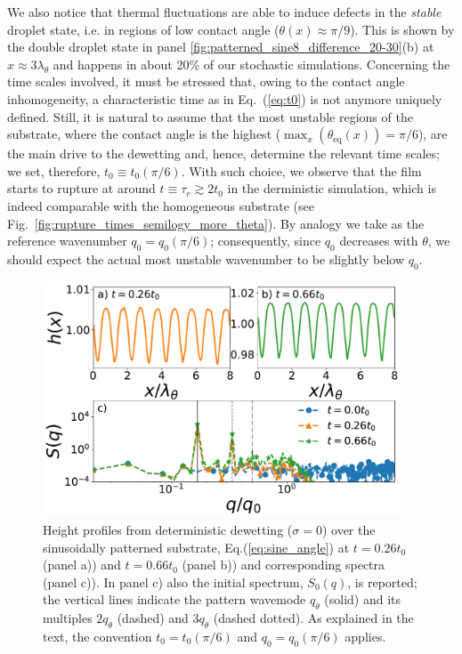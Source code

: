 We also notice that thermal fluctuations are able to induce defects in the \textit{stable} droplet state, i.e. in regions of low contact angle ($\theta(x) \approx \pi/9$). 
This is shown by the double droplet state in panel \ref{fig:patterned_sine8_difference_20-30}(b) at $x \approx 3 \lambda_{\theta}$ and happens in about 20\% of our stochastic simulations.
Concerning the time scales involved, it must be stressed that, owing to the contact angle inhomogeneity, a characteristic time as in Eq.~(\ref{eq:t0}) is not anymore uniquely defined. 
Still, it is natural to assume that the most unstable regions of the substrate, where the contact angle is the highest ($\max_x(\theta_{\text{eq}}(x)) = \pi/6$), are the main drive to the dewetting and, hence, determine the relevant time scales; we set, therefore, $t_0 \equiv t_0(\pi/6)$. 
With such choice, we observe that the film starts to rupture at around $t \equiv \tau_r \gtrsim 2 t_0$ in the derministic simulation, which is indeed comparable with the homogeneous substrate (see Fig.~\ref{fig:rupture_times_semilogy_more_theta}). 
By analogy we take as the reference wavenumber $q_0 = q_0(\pi/6)$; consequently, since $q_0$ decreases with $\theta$, we should expect the actual most unstable wavenumber to be slightly below $q_0$.
\begin{figure}
    \centering
    \includegraphics[width=0.95\textwidth]{graphics/psd_spacedepCA_sine_25_10_00_[0, 450000, 1150000]_9_3_rescaled.pdf}
    \caption{Height profiles from deterministic dewetting ($\sigma=0$) 
    over the sinusoidally patterned substrate, Eq.(\ref{eq:sine_angle}) at $t=0.26 t_0$ (panel a)) and $t=0.66 t_0$ (panel b))  
    and corresponding spectra (panel c)).  
    In panel c) also the initial spectrum, $S_0(q)$, is reported; the vertical lines indicate the pattern wavemode $q_{\theta}$ (solid) and its multiples $2q_{\theta}$ (dashed) and $3q_{\theta}$ (dashed dotted).
    As explained in the text, the convention $t_0 = t_0(\pi/6)$ and $q_0 = q_0(\pi/6)$ applies.}   
    \label{fig:spectral_analysis_deter_sine8}
\end{figure}
